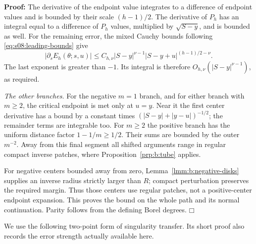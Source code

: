 \documentclass[a4paper,10pt]{article}
\numberwithin{equation}{section}
\theoremstyle{paperplain}
\theoremstyle{paperremark}
\theoremstyle{paperplain}
\newenvironment{prf}{\noindent \textbf{Proof: }}{\hfill $\mdlgwhtsquare$\par\addvspace{0.5\baselineskip}}
\begin{document}
\begin{prf}
The derivative of the endpoint value integrates to a difference
of endpoint values and is bounded by their scale $(h-1)/2$.
The derivative of $P_h$ has an integral equal to a difference of
$P_h$ values, multiplied by $\sqrt{S-y}$, and is bounded as well.
For the remaining error, the mixed Cauchy bounds following
\eqref{eq:s08:leading-bounds} give
\[
 |\partial_sE_h(\theta;s,u)|
 \leq C_{h,\nu}|S-y|^{\nu-1}
                    |S-y+u|^{(h-1)/2-\nu}.
\]
The last exponent is greater than $-1$. Its integral is therefore
$O_{h,\nu}(|S-y|^{\nu-1})$, as required.

\smallskip\noindent
\emph{The other branches.}
For the negative $m=1$ branch, and for either branch with $m\geq2$,
the critical endpoint is met only at $u=y$. Near it the first
center derivative has a bound by a constant times
$(|S-y|+|y-u|)^{-1/2}$; the remainder terms are integrable too.
For $m\geq2$ the positive branch has the uniform distance factor
$1-1/m\geq1/2$. Their sums are bounded by the outer $m^{-2}$.
Away from this final segment all shifted arguments range in
regular compact inverse patches, where
Proposition~\ref{prp:b:tube} applies.

For negative centers bounded
away from zero, Lemma~\ref{lmm:b:negative-disks} supplies an inverse
radius strictly larger than $R$; compact perturbation preserves the
required margin. Thus those centers use regular patches, not a
positive-center endpoint expansion. This proves the bound on the whole path and its normal
continuation. Parity follows from the defining Borel degrees.
\end{prf}

We use the following two-point form of singularity transfer. Its
short proof also records the error strength actually available here.
\end{document}
